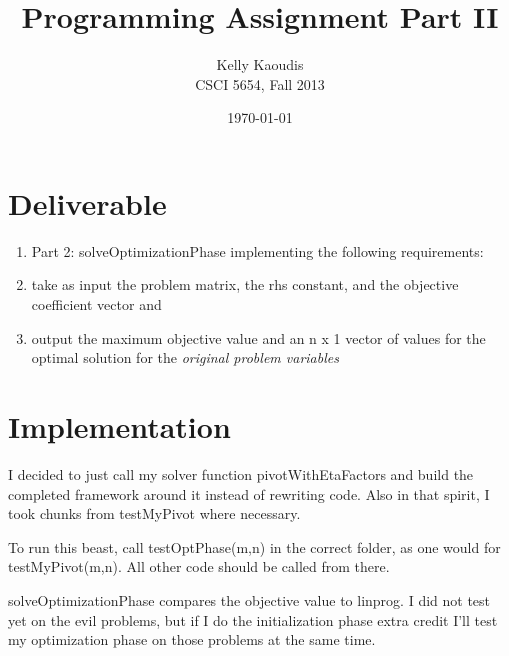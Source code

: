 \documentclass[9pt]{article}
\title{Programming Assignment Part II}
\author{
    Kelly Kaoudis \\
    CSCI 5654, Fall 2013 \\
}
\date{\today}
\begin{document}
\maketitle

\section{Deliverable}
\begin{enumerate}
    \item Part 2: solveOptimizationPhase implementing the following requirements:
    \item take as input the problem matrix, the rhs constant, and the objective
    coefficient vector and
    \item output the maximum objective value and an n x 1 vector of values for
    the optimal solution for the \textit{original problem variables}
\end{enumerate}

\section{Implementation}
I decided to just call my solver function pivotWithEtaFactors and build the
completed framework around it instead of rewriting code. Also in that spirit,
I took chunks from testMyPivot where necessary.

To run this beast, call testOptPhase(m,n) in the correct
folder, as one would for testMyPivot(m,n).
All other code should be called from there.

solveOptimizationPhase compares the objective
value to linprog. I did not test yet on the evil problems,
but if I do the initialization phase extra credit I'll
test my optimization phase on those problems at the same time.
\end{document}
